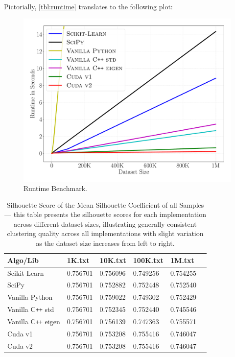 \documentclass{article}
\begin{document}
  Pictorially, \autoref{tbl:runtime} translates to the following plot:
  \begin{figure}[H]
    \centering
    \includegraphics[scale=0.25]{figures/runtime.pdf}
    \caption{Runtime Benchmark.}
    \label{fig:runtime}
  \end{figure}

  \begin{table}[H]
    \centering
    \begin{tabular}{|P{4cm}|P{2.5cm}|P{2.5cm}|P{2.5cm}|P{2.5cm}|P{2.5cm}|}
      \hline
      {\sf Algo/Lib} & {\sf 1K.txt} & {\sf 10K.txt} & {\sf 100K.txt} & {\sf 1M.txt} \\ \hline
      {\sc Scikit-Learn} & 0.756701 & 0.756096 & 0.749256 & 0.754255 \\
      {\sc SciPy} & 0.756701 & 0.752882 & 0.752448 & 0.752540 \\
      {\sc Vanilla Python} & 0.756701 & 0.759022 & 0.749302 & 0.752429 \\
      {\sc Vanilla C{\tt++} std} & 0.756701 & 0.752345 & 0.752440 & 0.745546 \\
      {\sc Vanilla C{\tt++} eigen} & 0.756701 & 0.756139 & 0.747363 & 0.755571 \\
      {\sc Cuda v1} & 0.756701 & 0.753208 & 0.755416 & 0.746047 \\
      {\sc Cuda v2} & 0.756701 & 0.753208 & 0.755416 & 0.746047 \\ \hline
    \end{tabular}
    \caption{
      Silhouette Score of the Mean Silhouette Coefficient of all Samples --- this
      table presents the silhouette scores for each implementation across different
      dataset sizes, illustrating generally consistent clustering quality across
      all implementations with slight variation as the dataset size increases from
      left to right.
    }
    \label{tbl:silhouette}
  \end{table}
\end{document}
